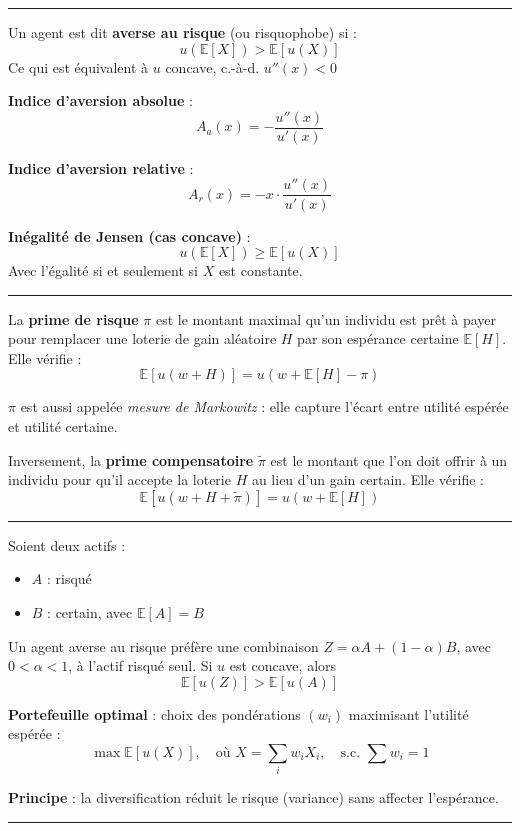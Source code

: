 \hrule

\begin{f}
	Un agent est dit \textbf{averse au risque} (ou risquophobe) si :
	\[
	u(\mathbb{E}[X]) > \mathbb{E}[u(X)]
	\]
	Ce qui est équivalent à \(u\) concave, c.-à-d. \(u''(x) < 0\)
\end{f}

\begin{f}
	\textbf{Indice d'aversion absolue} :
	\[
	A_a(x) = -\frac{u''(x)}{u'(x)}
	\]
	
	\textbf{Indice d'aversion relative} :
	\[
	A_r(x) = -x \cdot \frac{u''(x)}{u'(x)}
	\]
	
	\textbf{Inégalité de Jensen (cas concave)} :
	\[
	u(\mathbb{E}[X]) \geq \mathbb{E}[u(X)]
	\]
Avec l'égalité si et seulement si \(X\) est constante.
\end{f}
\hrule


\begin{f}
	
La \textbf{prime de risque} \(\pi\) est le montant maximal qu'un individu est prêt à payer pour remplacer une loterie de gain aléatoire \(H\) par son espérance certaine \(\mathbb{E}[H]\). Elle vérifie :
\[
\mathbb{E}[u(w + H)] = u(w + \mathbb{E}[H] - \pi)
\]


\(\pi\) est aussi appelée \emph{mesure de Markowitz} : elle capture l'écart entre utilité espérée et utilité certaine.

Inversement, la \textbf{prime compensatoire} \(\tilde{\pi}\) est le montant que l'on doit offrir à un individu pour qu’il accepte la loterie \(H\) au lieu d’un gain certain. Elle vérifie :
\[
\mathbb{E}[u(w + H + \tilde{\pi})] = u(w + \mathbb{E}[H])
\]

\end{f}
\hrule
\begin{f}
	
	Soient deux actifs :
	\begin{itemize}
		\item \(A\) : risqué
		\item \(B\) : certain, avec \(\mathbb{E}[A] = B\)
	\end{itemize}
	
	Un agent averse au risque préfère une combinaison \(Z = \alpha A + (1 - \alpha) B\), avec \(0 < \alpha < 1\), à l’actif risqué seul.
	Si  $u$ est concave, alors
	\[
	\mathbb{E}[u(Z)] > \mathbb{E}[u(A)]
	\]
	
	\textbf{Portefeuille optimal} : choix des pondérations \((w_i)\) maximisant l'utilité espérée :
	\[
	\max \mathbb{E}[u(X)], \quad \text{où } X = \sum_{i} w_i X_i, \quad \text{s.c. } \sum w_i = 1
	\]
	
	\textbf{Principe} : la diversification réduit le risque (variance) sans affecter l’espérance.
	
	
\end{f}
\hrule

